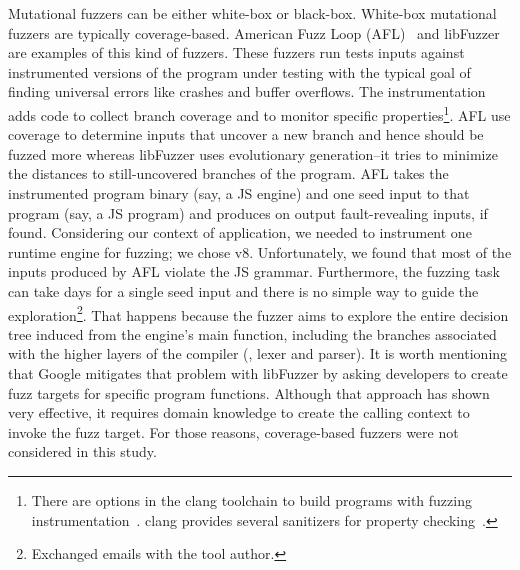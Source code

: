 \documentclass[10pt,conference,anonymous]{IEEEtran}
\begin{document}


Mutational fuzzers can be either white-box or black-box. White-box
mutational fuzzers are typically coverage-based. American Fuzz Loop
(AFL)~\cite{afl} and libFuzzer~\cite{libfuzzer} are examples of this
kind of fuzzers. These fuzzers run tests inputs against instrumented
versions of the program under testing with the typical goal of finding
universal errors like crashes and buffer overflows. The instrumentation
adds code to collect branch coverage and to monitor specific
properties\footnote{There are options in the clang toolchain to build
  programs with fuzzing instrumentation~\cite{libfuzzer}. clang
  provides several sanitizers for property
  checking~\cite{clang-documentation}.}. AFL use coverage to determine
inputs that uncover a new branch and hence should be fuzzed more
whereas libFuzzer uses evolutionary generation--it tries to minimize
the distances to still-uncovered branches of the program. AFL takes
the instrumented program binary (say, a JS engine) and one seed input
to that program (say, a JS program) and produces on output
fault-revealing inputs, if found. Considering our context of
application, we needed to instrument one runtime engine for fuzzing;
we chose v8. Unfortunately, we found that most of the inputs produced
by AFL violate the JS grammar. Furthermore, the fuzzing task can take
days for a single seed input and there is no simple way to guide the
exploration\footnote{Exchanged emails with the tool author.}. That
happens because the fuzzer aims to explore the entire decision tree
induced from the engine's main function, including the branches
associated with the higher layers of the compiler (\eg{}, lexer and
parser). It is worth mentioning that Google mitigates that problem
with libFuzzer by asking developers to create fuzz targets for
specific program
functions\cite{libFuzzer-tutorial-google,libFuzzer-chromium-google}. Although
that approach has shown very effective, it requires domain knowledge
to create the calling context to invoke the fuzz target. For those
reasons, coverage-based fuzzers were not considered in this study.
\end{document}

